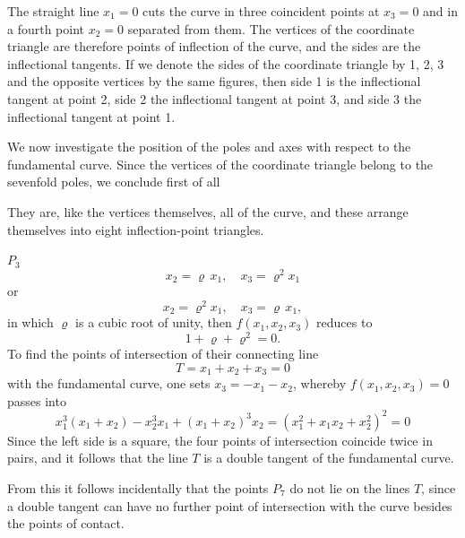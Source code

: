 The straight line $x_1 = 0$ cuts the curve in three coincident
points at $x_3 = 0$ and in a fourth point $x_2 = 0$ separated from
them. The vertices of the coordinate triangle are therefore points of
inflection of the curve, and the sides are the inflectional tangents.
If we denote the sides of the coordinate triangle by 1, 2, 3 and the
opposite vertices by the same figures, then side 1 is the inflectional
tangent at point 2, side 2 the inflectional tangent at point 3, and
side 3 the inflectional tangent at point 1.

We now investigate the position of the poles and axes with respect to
the fundamental curve. Since the vertices of the coordinate triangle
belong to the sevenfold poles, we conclude first of all

They are, like the vertices themselves, all  of
the curve, and these arrange themselves into eight inflection-point
triangles.

 $P_3$ 
\[
x_2 = \varrho\,x_1, \quad x_3 = \varrho^2 x_1
\]
or
\[
x_2 = \varrho^2 x_1, \quad x_3 = \varrho\,x_1,
\]
in which $\varrho$ is a cubic root of unity, then
$f(x_1, x_2, x_3)$ reduces to
\[
1 + \varrho + \varrho^2 = 0.
\]
To find the points of intersection of their connecting line
\[
T = x_1 + x_2 + x_3 = 0
\]
with the fundamental curve, one sets $x_3 = -x_1 - x_2$, whereby
$f(x_1, x_2, x_3) = 0$ passes into
\[
x_1^3(x_1+x_2) - x_2^3 x_1 + (x_1+x_2)^3 x_2 = (x_1^2+x_1x_2+x_2^2)^2 = 0
\]
Since the left side is a square, the four points of intersection
coincide twice in pairs, and it follows that the line $T$ is a
double tangent of the fundamental curve.


From this it follows incidentally that the points $P_7$ do not lie
on the lines $T$, since a double tangent can have no further point
of intersection with the curve besides the points of contact.

